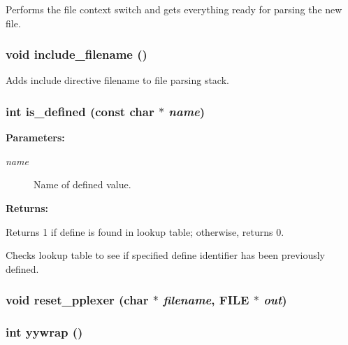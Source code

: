 Performs the file context switch and gets everything ready for parsing the new file. 
\subsubsection{\setlength{\rightskip}{0pt plus 5cm}void include\_\-filename ()\hspace{0.3cm}{\tt  [static]}}\label{pplexer_8c_a132}


Adds include directive filename to file parsing stack. 
\subsubsection{\setlength{\rightskip}{0pt plus 5cm}int is\_\-defined (const char $\ast$ {\em name})\hspace{0.3cm}{\tt  [static]}}\label{pplexer_8c_a131}


\begin{Desc}
\item[{\bf Parameters: }]\par
\begin{description}
\item[
{\em name}]Name of defined value.

\end{description}
\end{Desc}
\begin{Desc}
\item[{\bf Returns: }]\par
Returns 1 if define is found in lookup table; otherwise, returns 0.

\end{Desc}
Checks lookup table to see if specified define identifier has been previously defined. 
\subsubsection{\setlength{\rightskip}{0pt plus 5cm}void reset\_\-pplexer (char $\ast$ {\em filename}, FILE $\ast$ {\em out})}\label{pplexer_8c_a139}


\subsubsection{\setlength{\rightskip}{0pt plus 5cm}int yywrap ()\hspace{0.3cm}{\tt  [static]}}\label{pplexer_8c_a134}




